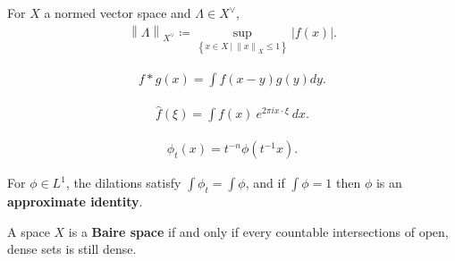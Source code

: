 \begin{definition}

For \(X\) a normed vector space and \(\Lambda \in X^\vee\),
\begin{align*}
{\left\lVert {\Lambda} \right\rVert}_{X^\vee} \coloneqq\sup_{\left\{{x\in X {~\mathrel{\Big|}~}{\left\lVert {x} \right\rVert}_X \leq 1}\right\}} {\left\lvert {f(x)} \right\rvert}
.\end{align*}

\end{definition}

\begin{definition}[Convolution]

\begin{align*}f * g(x)=\int f(x-y) g(y) d y .\end{align*}

\end{definition}

\begin{definition}

\begin{align*}
\widehat{f}(\xi) = \int f(x) ~e^{2\pi i x \cdot \xi} ~dx
.\end{align*}

\end{definition}

\begin{definition}[Dilation]

\begin{align*}
\phi_{t}(x) = t^{-n} \phi\left(t^{-1} x\right)
.\end{align*}

\end{definition}

\begin{definition}

For \(\phi\in L^1\), the dilations satisfy
\(\int \phi_{t} = \int \phi\), and if \(\int \phi = 1\) then \(\phi\) is
an \textbf{approximate identity}.

\end{definition}

\begin{definition}

A space \(X\) is a \textbf{Baire space} if and only if every countable
intersections of open, dense sets is still dense.

\end{definition}

